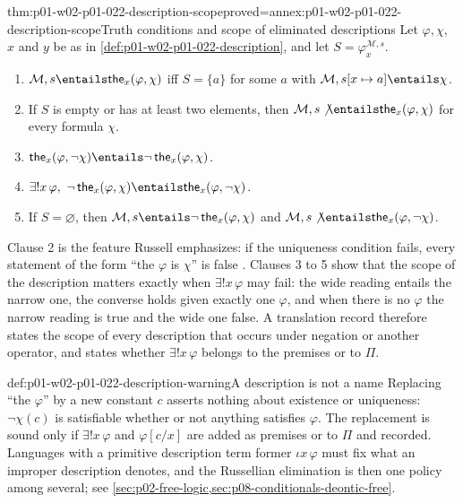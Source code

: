 \begin{hbtheorem}{thm:p01-w02-p01-022-description-scope}{proved=annex:p01-w02-p01-022-description-scope}{Truth conditions and scope of eliminated descriptions}
Let \(\varphi,\chi\), \(x\) and \(y\) be as in
\cref{def:p01-w02-p01-022-description}, and let \(S=\varphi^{\mathcal M,s}_x\).
\begin{enumerate}
  \item \(\mathcal M,s\entails\mathsf{the}_x(\varphi,\chi)\) iff
        \(S=\{a\}\) for some \(a\) with
        \(\mathcal M,s[x\mapsto a]\entails\chi\).
  \item If \(S\) is empty or has at least two elements, then
        \(\mathcal M,s\not\entails\mathsf{the}_x(\varphi,\chi)\) for every
        formula \(\chi\).
  \item \(\mathsf{the}_x(\varphi,\neg\chi)\entails
        \neg\,\mathsf{the}_x(\varphi,\chi)\).
  \item \(\exists!x\,\varphi,\ \neg\,\mathsf{the}_x(\varphi,\chi)\entails
        \mathsf{the}_x(\varphi,\neg\chi)\).
  \item If \(S=\varnothing\), then
        \(\mathcal M,s\entails\neg\,\mathsf{the}_x(\varphi,\chi)\) and
        \(\mathcal M,s\not\entails\mathsf{the}_x(\varphi,\neg\chi)\).
\end{enumerate}
\end{hbtheorem}

Clause 2 is the feature Russell emphasizes: if the uniqueness condition
fails, every statement of the form ``the \(\varphi\) is \(\chi\)'' is false
\cite[482]{Russell1905}. Clauses 3 to 5 show that the scope of the
description matters exactly when \(\exists!x\,\varphi\) may fail: the wide
reading entails the narrow one, the converse holds given exactly one
\(\varphi\), and when there is no \(\varphi\) the narrow reading is true and
the wide one false. A translation record therefore states the scope of every
description that occurs under negation or another operator, and states
whether \(\exists!x\,\varphi\) belongs to the premises or to \(\Pi\).

\begin{hbwarning}{def:p01-w02-p01-022-description-warning}{A description is not a name}
Replacing ``the \(\varphi\)'' by a new constant \(c\) asserts nothing about
existence or uniqueness: \(\neg\chi(c)\) is satisfiable whether or not
anything satisfies \(\varphi\). The replacement is sound only if
\(\exists!x\,\varphi\) and \(\varphi[c/x]\) are added as premises or to
\(\Pi\) and recorded. Languages with a primitive description term former
\(\iota x\,\varphi\) must fix what an improper description denotes, and the
Russellian elimination is then one policy among several; see
\cref{sec:p02-free-logic,sec:p08-conditionals-deontic-free}.
\end{hbwarning}

